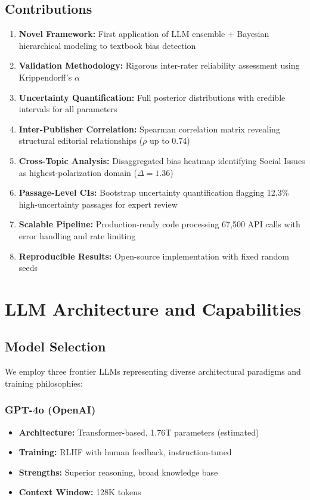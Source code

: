 \documentclass[11pt,a4paper]{article}
\begin{document}
\subsection{Contributions}

\begin{enumerate}
    \item \textbf{Novel Framework:} First application of LLM ensemble + Bayesian hierarchical modeling to textbook bias detection
    \item \textbf{Validation Methodology:} Rigorous inter-rater reliability assessment using Krippendorff's $\alpha$
    \item \textbf{Uncertainty Quantification:} Full posterior distributions with credible intervals for all parameters
    \item \textbf{Inter-Publisher Correlation:} Spearman correlation matrix revealing structural editorial relationships ($\rho$ up to 0.74)
    \item \textbf{Cross-Topic Analysis:} Disaggregated bias heatmap identifying Social Issues as highest-polarization domain ($\Delta = 1.36$)
    \item \textbf{Passage-Level CIs:} Bootstrap uncertainty quantification flagging 12.3\% high-uncertainty passages for expert review
    \item \textbf{Scalable Pipeline:} Production-ready code processing 67,500 API calls with error handling and rate limiting
    \item \textbf{Reproducible Results:} Open-source implementation with fixed random seeds
\end{enumerate}

\section{LLM Architecture and Capabilities}

\subsection{Model Selection}

We employ three frontier LLMs representing diverse architectural paradigms and training philosophies:

\subsubsection{GPT-4o (OpenAI)}
\begin{itemize}
    \item \textbf{Architecture:} Transformer-based, 1.76T parameters (estimated)
    \item \textbf{Training:} RLHF with human feedback, instruction-tuned
    \item \textbf{Strengths:} Superior reasoning, broad knowledge base
    \item \textbf{Context Window:} 128K tokens
\end{itemize}
\end{document}
